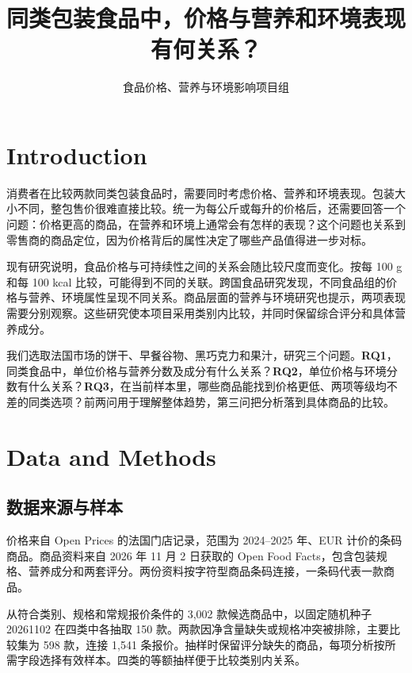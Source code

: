 \documentclass[11pt,a4paper,onecolumn,oneside]{tau-class/tau}
\title{同类包装食品中，价格与营养和环境表现有何关系？}
\author{食品价格、营养与环境影响项目组}
\begin{document}
\maketitle\thispagestyle{firststyle}
\section{Introduction}
消费者在比较两款同类包装食品时，需要同时考虑价格、营养和环境表现。包装大小不同，整包售价很难直接比较。统一为每公斤或每升的价格后，还需要回答一个问题：价格更高的商品，在营养和环境上通常会有怎样的表现？这个问题也关系到零售商的商品定位，因为价格背后的属性决定了哪些产品值得进一步对标。

现有研究说明，食品价格与可持续性之间的关系会随比较尺度而变化。按每 100 g 和每 100 kcal 比较，可能得到不同的关联\cite{masset2015}。跨国食品研究发现，不同食品组的价格与营养、环境属性呈现不同关系\cite{martinez2025}。商品层面的营养与环境研究也提示，两项表现需要分别观察\cite{clark2022}。这些研究使本项目采用类别内比较，并同时保留综合评分和具体营养成分。

我们选取法国市场的饼干、早餐谷物、黑巧克力和果汁，研究三个问题。\textbf{RQ1}，同类食品中，单位价格与营养分数及成分有什么关系？\textbf{RQ2}，单位价格与环境分数有什么关系？\textbf{RQ3}，在当前样本里，哪些商品能找到价格更低、两项等级均不差的同类选项？前两问用于理解整体趋势，第三问把分析落到具体商品的比较。

\section{Data and Methods}
\subsection{数据来源与样本}
价格来自 Open Prices 的法国门店记录，范围为 2024--2025 年、EUR 计价的条码商品。商品资料来自 2026 年 11 月 2 日获取的 Open Food Facts，包含包装规格、营养成分和两套评分。两份资料按字符型商品条码连接，一条码代表一款商品。

从符合类别、规格和常规报价条件的 3,002 款候选商品中，以固定随机种子 20261102 在四类中各抽取 150 款。两款因净含量缺失或规格冲突被排除，主要比较集为 598 款，连接 1,541 条报价。抽样时保留评分缺失的商品，每项分析按所需字段选择有效样本。四类的等额抽样便于比较类别内关系。
\begin{table}[!ht]\centering\small\caption{四类商品的样本量、价格中位数与等级覆盖。每款商品在类别汇总中具有相同权重。}\label{tab:sample}\end{table}
\end{document}
